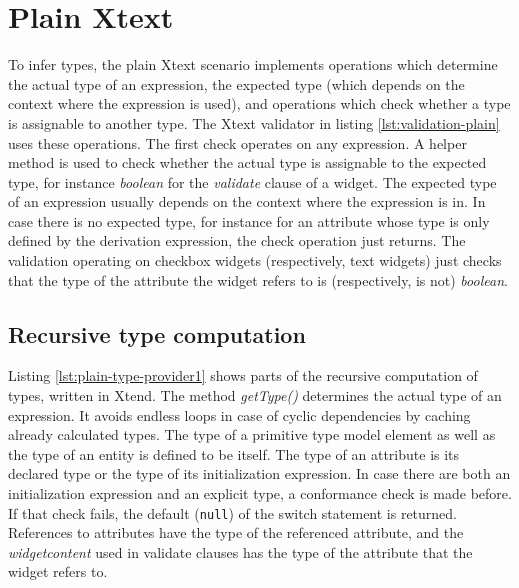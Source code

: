 \section{Plain Xtext}
\label{sec:plain-xtext}

To infer types, the plain Xtext scenario implements operations which determine
the actual type of an expression, the expected type (which depends on the
context where the expression is used), and operations which check whether a type
is assignable to another type. The Xtext validator in listing
\ref{lst:validation-plain} uses these operations. The first check operates on
any expression. A helper method is used to check whether the actual type is assignable to the expected type, for instance \emph{boolean} for the
\emph{validate} clause of a widget. The expected type of an expression usually
depends on the context where the expression is in. In case there is no expected
type, for instance for an attribute whose type is only defined by the
derivation expression, the check operation just returns. The validation
operating on checkbox widgets (respectively, text widgets) just checks that the
type of the attribute the widget refers to is (respectively, is not)
\emph{boolean}.




\subsection{Recursive type computation}
\label{sec:rectypecomputation}

Listing \ref{lst:plain-type-provider1} shows parts of the recursive computation
of types, written in Xtend. The method \emph{getType()} determines the actual
type of an expression. It avoids endless loops in case of cyclic dependencies by
caching already calculated types. The type of a primitive type model element as
well as the type of an entity is defined to be itself. The type of an attribute
is its declared type or the type of its initialization
expression.
In case there are both an initialization expression and an explicit type, a conformance
check is made before. If that check fails, the default (\verb|null|) of the
switch statement is returned. References to attributes have the type of the
referenced attribute, and the \emph{widgetcontent} used in validate clauses has
the type of the attribute that the widget refers to.

